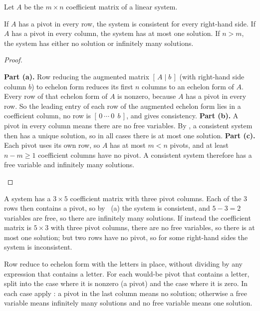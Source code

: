 \documentclass[10pt]{scrartcl}
\begin{document}
\begin{corollary*}
  Let $A$ be the $m\times n$ coefficient matrix of a linear system.
  \begin{enumerate}[(a)]
    \ii If $A$ has a pivot in every row, the system is consistent for every right-hand side.
    \ii If $A$ has a pivot in every column, the system has at most one solution.
    \ii If $n>m$, the system has either no solution or infinitely many solutions.
  \end{enumerate}
\end{corollary*}
\begin{proof}
  \begin{steps}
    \ii \textbf{Part (a).} Row reducing the augmented matrix $[\,A\mid b\,]$ (with right-hand side column $b$) to echelon form reduces its first $n$ columns to an echelon form of $A$. Every row of that echelon form of $A$ is nonzero, because $A$ has a pivot in every row. So the leading entry of each row of the augmented echelon form lies in a coefficient column, no row is $[\,0\ \cdots\ 0\ \ b\,]$, and  gives consistency.
    \ii \textbf{Part (b).} A pivot in every column means there are no free variables. By , a consistent system then has a unique solution, so in all cases there is at most one solution.
    \ii \textbf{Part (c).} Each pivot uses its own row, so $A$ has at most $m<n$ pivots, and at least $n-m\ge1$ coefficient columns have no pivot. A consistent system therefore has a free variable and infinitely many solutions.
  \end{steps}
\end{proof}

\begin{example*}
A system has a $3\times5$ coefficient matrix with three pivot columns. Each of the $3$ rows then contains a pivot, so by ~(a) the system is consistent, and $5-3=2$ variables are free, so there are infinitely many solutions. If instead the coefficient matrix is $5\times3$ with three pivot columns, there are no free variables, so there is at most one solution; but two rows have no pivot, so for some right-hand sides the system is inconsistent.
\end{example*}

\begin{steps}
  \ii Row reduce to echelon form with the letters in place, without dividing by any expression that contains a letter.
  \ii For each would-be pivot that contains a letter, split into the case where it is nonzero (a pivot) and the case where it is zero.
  \ii In each case apply : a pivot in the last column means no solution; otherwise a free variable means infinitely many solutions and no free variable means one solution.
\end{steps}
\end{document}
